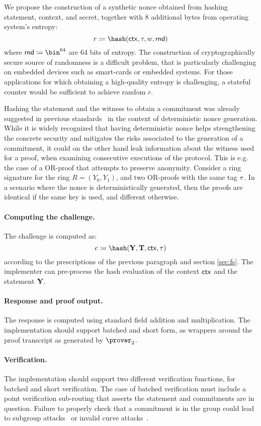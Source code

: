 \documentclass[runningheads,11pt]{article}
\begin{document}
We propose the construction of a synthetic nonce obtained from hashing statement, context, and secret, together with 8 additional bytes from operating system's entropy:
\[
  r \defeq \hash(\ctx, \stag, \witness, \mathsf{rnd})
\]
where $\mathsf{rnd} \defeq \bin^{64}$ are 64 bits of entropy.
The construction of cryptographically secure source of randomness is a difficult problem, that is particularly challenging on embedded devices such as smart-cards or embedded systems. For those applications for which obtaining a high-quality entropy is challenging, a stateful counter would be sufficient to achieve random $r$.

Hashing the statement and the witness to obtain a commitment was already suggested in previous standards~\cite{rfc6979} in the context of deterministic nonce generation.
While it is widely recognized that having deterministic nonce helps strengthening the concrete security  and mitigates the risks associated to the generation of a commitment, it could on the other hand leak information about the witness used for a proof, when examining consecutive executions of the protocol. This is e.g. the case of a OR-proof that attempts to preserve anonymity.
Consider a ring signature for the ring \(R = (Y_0 , Y_1)\),
and two OR-proofs with the same tag $\tau$.  In a scenario where the nonce is deterministically generated, then the proofs are identical if the same key is used, and different otherwise.

\paragraph{Computing the challenge.}
The challenge is computed as:
\[
  c \defeq \hash(\vec \statement, \vec \commitment, \ctx, \stag)
\]
according to the prescriptions of the previous paragraph and section \cref{sec:fs}. The implementer can pre-process the hash evaluation of the context $\mathsf{ctx}$ and the statement $\mathbf {Y}$.

\paragraph{Response and proof output.} The response is computed using standard field addition and multiplication. The implementation should support batched and short form, as wrappers around the proof transcript as generated by $\prover_2$.
\paragraph{Verification.} The implementation should support two different verification functions, for batched and short verification.
The case of batched verification must include a point verification sub-routing that asserts the statement and commitments are in question. Failure to properly check that a commitment is in the group could lead to subgroup attacks~\cite{EC:VanWie96,C:LimLee97} or invalid curve attacks~\cite{C:BieMeyMul00,RSA:BBPV12}.
\end{document}
